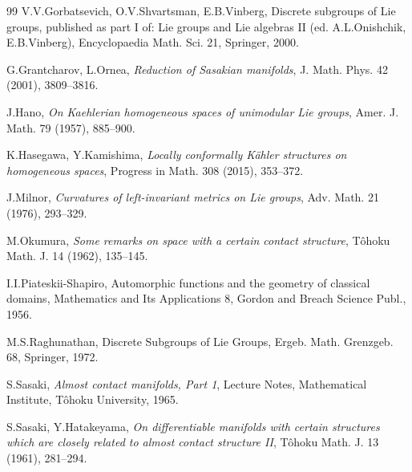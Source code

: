 \documentclass[12pt, twoside]{amsart}
\theoremstyle{definition}
\begin{document}
\begin{thebibliography}{99}
 V.V.Gorbatsevich, O.V.Shvartsman, E.B.Vinberg, Discrete subgroups of Lie groups, published as part I of: Lie groups and Lie algebras II (ed. A.L.Onishchik, E.B.Vinberg), Encyclopaedia Math. Sci. 21, Springer, 2000.

G.Grantcharov, L.Ornea, \textit{Reduction of Sasakian manifolds}, J. Math. Phys. 42 (2001), 3809--3816.

J.Hano, \textit{On Kaehlerian homogeneous spaces of unimodular Lie groups}, Amer. J. Math. 79 (1957), 885--900.

 K.Hasegawa, Y.Kamishima, \textit{Locally conformally K{\"a}hler structures on homogeneous spaces}, Progress in Math. 308 (2015), 353--372.

 J.Milnor, \textit{Curvatures of left-invariant metrics on Lie groups}, Adv. Math. 21 (1976), 293--329.

M.Okumura, \textit{Some remarks on space with a certain contact structure}, T{\^o}hoku Math. J. 14 (1962), 135--145.

I.I.Piateskii-Shapiro, Automorphic functions and the geometry of classical domains, Mathematics and Its Applications 8, Gordon and Breach Science Publ., 1956.

 M.S.Raghunathan, Discrete Subgroups of Lie Groups, Ergeb. Math. Grenzgeb. 68, Springer, 1972.

S.Sasaki, \textit{Almost contact manifolds, Part 1}, Lecture Notes, Mathematical Institute, T{\^o}hoku University, 1965.

S.Sasaki, Y.Hatakeyama, \textit{On differentiable manifolds with certain structures which are closely related to almost contact structure II}, T{\^o}hoku Math. J. 13 (1961), 281--294. 

\end{thebibliography}


\end{document}
